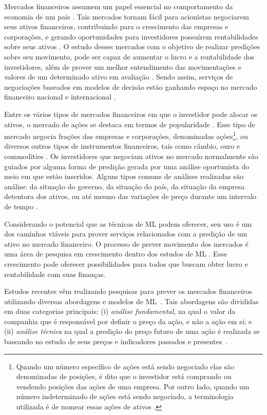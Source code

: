 Mercados financeiros assumem um papel essencial no comportamento da economia de um país \cite{investments, gomes1997bolsa, elton2012moderna}. Tais mercados tornam fácil para acionistas negociarem seus ativos financeiros, contribuindo para o crescimento das empresas e corporações, e gerando oportunidades para investidores possuírem rentabilidades sobre seus ativos \cite{investments}. O estudo desses mercados com o objetivo de realizar predições sobre seu movimento, pode ser capaz de aumentar o lucro e a rentabilidade dos investidores, além de prover um melhor entendimento das movimentações e valores de um determinado ativo em avaliação \cite{review}. Sendo assim, serviços de negociações baseados em modelos de decisão estão ganhando espaço no mercado financeiro nacional e internacional \cite{review}. 

Entre os vários tipos de mercados financeiros em que o investidor pode alocar os ativos, o mercado de ações se destaca em termos de popularidade \cite{investments}. Esse tipo de mercado negocia frações das empresas e corporações, denominadas ações\footnote{Quando um número específico de ações está sendo negociado elas são denominadas de posições, é dito que o investidor está comprando ou vendendo posições das ações de uma empresa. Por outro lado, quando um número indeterminado de ações está sendo negociado, a terminologia utilizada é de nomear essas ações de ativos \cite{investments}.}, ou diversos outros tipos de instrumentos financeiros, tais como câmbio, ouro e commodities \cite{elton2012moderna}. Os investidores que negociam ativos no mercado normalmente são guiados por alguma forma de predição gerada por uma análise oportunista do meio em que estão inseridos. Alguns tipos comuns de análises realizadas são análise: da situação do governo, da situação do país, da situação da empresa detentora dos ativos, ou até mesmo das variações de preço durante um intervalo de tempo \cite{review}.

Considerando o potencial que as técnicas de \acrfull{ML} podem oferecer, seu uso é um dos caminhos viáveis para prover serviços relacionados com a predição de um ativo no mercado financeiro. O processo de prever movimento dos mercados é uma área de pesquisa em crescimento dentro dos estudos de \acrshort{ML} \cite{review}. Esse crescimento pode oferecer possibilidades para todos que buscam obter lucro e rentabilidade com suas finanças.

Estudos recentes vêm realizando pesquisas para prever os mercados financeiros utilizando diversas abordagens e modelos de \acrshort{ML}~\cite{google_trends, cesarone2011portfolio, predicting_direction_svm,  hybrid_forecasting, gabased_svm, forecasting_returns, nn_forecasting}. Tais abordagens são divididas em duas categorias principais: (i) \textit{análise fundamental}, na qual o valor da companhia que é responsável por definir o preço da ação, e não a ação em si; e (ii) \textit{análise técnica} na qual a predição do preço futuro de uma ação é realizada se baseando no estudo de seus preços e indicadores passados e presentes~\cite{fundamental_technical_analysis}.

